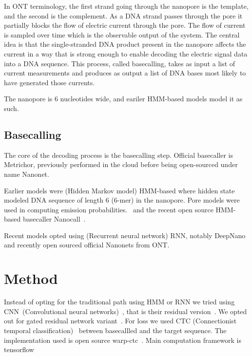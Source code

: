 \documentclass[times, utf8, seminar, numeric]{fer}
\begin{document}
In ONT terminology, the first strand going through the nanopore is the template, and the second is the complement. As a DNA strand passes through the pore it partially blocks the flow of electric current through the pore. The flow of current is sampled over time which is the observable output of the system. The central idea is that the single-stranded DNA product present in the nanopore affects the current in a way that is strong enough to enable decoding the electric signal data into a DNA sequence. This process, called basecalling, takes as input a list of current measurements and produces as output a list of DNA bases most likely to have generated those currents.

The nanopore is 6 nucleotides wide, and eariler HMM-based models model it as such.

\section{Basecalling}

The core of the decoding process is the basecalling step. Official basecaller is Metrichor, previously performed in the cloud before being open-sourced under name Nanonet.

Earlier models were (Hidden Markov model) HMM-based where hidden state modeled DNA sequence of length 6 (6-mer) in the nanopore. Pore models were used in computing emission probabilities.~\cite{loman2015complete,schreiber2015analysis,szalay2015novo,timp2012dna} and the recent open source HMM-based basecaller Nanocall~\cite{david2016nanocall}.

Recent models opted using (Recurrent neural network) RNN, notably DeepNano~\cite{deepnano} and recently open sourced official Nanonets from ONT.

\chapter{Method}

Instead of opting for the traditional path using HMM or RNN we tried using CNN~(Convolutional neural networks)~\cite{lecun-98}, that is their residual version~\cite{he2016deep}. We opted out for gated residual network variant~\cite{savarese2016learning}. For loss we used CTC (Connectionist temporal classification)~\cite{graves2006connectionist} between basecallled and the target sequence. The implementation used is open source warp-ctc~\cite{warpctc}. Main computation framework is tensorflow~\cite{tensorflow2015-whitepaper}
\end{document}
